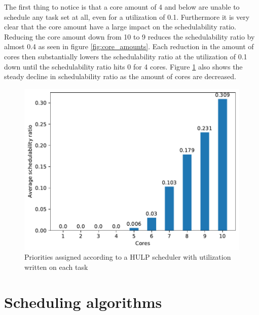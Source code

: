 \documentclass{kththesis}
\begin{document}
The first thing to notice is that a core amount of 4 and below are unable to schedule any task set
at all, even for a utilization of 0.1. Furthermore it is very clear that the core amount have a
large impact on the schedulability ratio. Reducing the core amount down from 10 to 9 reduces the
schedulability ratio by almost 0.4 as seen in figure \ref{fig:core_amounts}. Each reduction in the
amount of cores then substantially lowers the schedulability ratio at the utilization of 0.1 down
until the schedulability ratio hits 0 for 4 cores. Figure \ref{fig:core_amounts_averages} also shows
the steady decline in schedulability ratio as the amount of cores are decreased.

\begin{figure}[H]

    \centering

    \includegraphics[width=1.0\linewidth]{images/core_amounts_averages.pdf}

    \caption{Priorities assigned according to a HULP scheduler with utilization written on each task}

    \label{fig:core_amounts_averages}

\end{figure}

\section{Scheduling algorithms} \label{sec:results_scheduling_algorithms}
\end{document}
